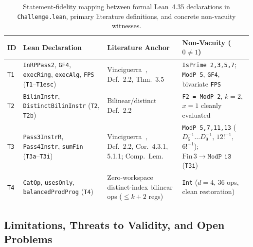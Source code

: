 \documentclass[11pt,reqno]{amsart}
\theoremstyle{definition}
\begin{document}
\begin{table}[ht]
\centering
\caption{Statement-fidelity mapping between formal Lean~4.35 declarations in \texttt{Challenge.lean}, primary literature definitions, and concrete non-vacuity witnesses.}
\label{tab:fidelity}
\footnotesize
\setlength{\tabcolsep}{4pt}
\begin{tabular}{@{}l>{\raggedright\arraybackslash}p{3.4cm}>{\raggedright\arraybackslash}p{3.3cm}>{\raggedright\arraybackslash}p{3.9cm}@{}}
\toprule
\textbf{ID} & \textbf{Lean Declaration} & \textbf{Literature Anchor} & \textbf{Non-Vacuity ($0 \neq 1$)} \\
\midrule
\texttt{T1} & \texttt{InRPPass2}, \texttt{GF4}, \texttt{execRing}, \texttt{execAlg}, \texttt{FPS} (\texttt{T1}--\texttt{T1esc}) & Vinciguerra~\cite{Vinciguerra2026}, Def.~2.2, Thm.~3.5 & \texttt{IsPrime 2,3,5,7}; \texttt{ModP 5}, \texttt{GF4}, bivariate \texttt{FPS} \\
\texttt{T2} & \texttt{BilinInstr}, \texttt{DistinctBilinInstr} (\texttt{T2}, \texttt{T2b}) & Bilinear/distinct Def.~2.2 & \texttt{F2 = ModP 2}, $k=2$, $x=1$ cleanly evaluated \\
\texttt{T3} & \texttt{Pass3InstrR}, \texttt{Pass4Instr}, \texttt{sumFin} (\texttt{T3a}--\texttt{T3i}) & Vinciguerra~\cite{Vinciguerra2026}, Def.~2.2, Cor.~4.3.1, 5.1.1; Comp.\ Lem.~\cite{AFM2025} & \texttt{ModP 5,7,11,13} ($D_5^{-1}\!\dots D_9^{-1}$, $12!^{-1}$, $6!^{-1}$); $\mathrm{Fin}\,3\!\to\!\texttt{ModP 13}$ (\texttt{T3i}) \\
\texttt{T4} & \texttt{CatOp}, \texttt{usesOnly}, \texttt{balancedProdProg} (\texttt{T4}) & Zero-workspace distinct-index bilinear ops ($\le k+2$ regs) & \texttt{Int} ($d=4$, $36$ ops, clean restoration) \\
\bottomrule
\end{tabular}
\end{table}

\subsection{Limitations, Threats to Validity, and Open Problems}
\label{sec:open}
\end{document}
